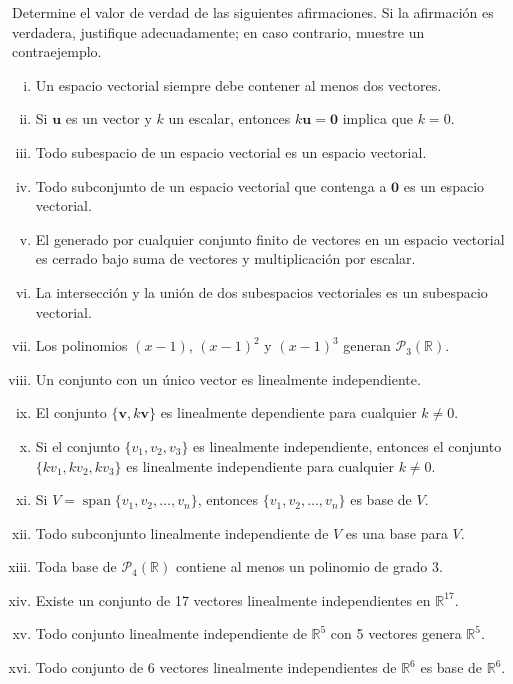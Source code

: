 \begin{prob} Determine el valor de verdad de las siguientes afirmaciones. Si la afirmación es verdadera, justifique adecuadamente; en caso contrario, muestre un contraejemplo.

\begin{enumerate}[i.] 
\item Un espacio vectorial siempre debe contener al menos dos vectores.
\item Si $\mathbf{u}$ es un vector y $k$ un escalar, entonces $k\mathbf{u} = \mathbf{0}$ implica que $k = 0$.
\item Todo subespacio de un espacio vectorial es un espacio vectorial.
\item Todo subconjunto de un espacio vectorial que contenga a $\mathbf{0}$ es un espacio vectorial.
\item El generado por cualquier conjunto finito de vectores en un espacio vectorial es cerrado bajo suma de vectores y multiplicación por escalar.
\item La intersección y la unión de dos subespacios vectoriales es un subespacio vectorial.
\item Los polinomios $(x-1)$, $(x-1)^2$ y $(x-1)^3$ generan $\mathcal{P}_3(\mathbb{R})$.
\item Un conjunto con un único vector es linealmente independiente.
\item El conjunto $\{\mathbf{v}, k\mathbf{v}\}$ es linealmente dependiente para cualquier $k \neq 0$.
\item Si el conjunto $\{v_1, v_2, v_3\}$ es linealmente independiente, entonces el conjunto $\{kv_1, kv_2, kv_3\}$ es linealmente independiente para cualquier $k \neq 0$.
\item Si $V = \operatorname{span}\{v_1, v_2, \ldots, v_n\}$, entonces $\{v_1, v_2, \ldots, v_n\}$ es base de $V$.
\item Todo subconjunto linealmente independiente de $V$ es una base para $V$.
\item Toda base de $\mathcal{P}_4(\mathbb{R})$ contiene al menos un polinomio de grado 3.
\item Existe un conjunto de 17 vectores linealmente independientes en $\mathbb{R}^{17}$.
\item Todo conjunto linealmente independiente de $\mathbb{R}^5$ con 5 vectores genera $\mathbb{R}^5$.
\item Todo conjunto de 6 vectores linealmente independientes de $\mathbb{R}^6$ es base de $\mathbb{R}^6$.
\end{enumerate}
\end{prob}


